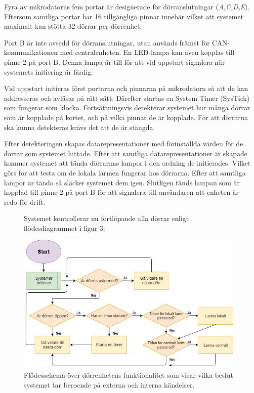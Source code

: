 \documentclass{article}
\begin{document}
Fyra av mikrodatorns fem portar är designerade för dörranslutningar (\textit{A,C,D,E}). \\ 
Eftersom samtliga portar har 16 tillgängliga pinnar innebär vilket att systemet maximalt kan stötta 32 dörrar per dörrenhet.

Port B är inte avsedd för dörranslutningar, utan används främst för CAN-\\kommunikationen 
med centralenheten. En LED-lampa kan även kopplas till \\ pinne 2 på port B. Denna lampa är till för att vid uppstart signalera när systemets initiering är färdig.

Vid uppstart initieras först portarna och pinnarna på mikrodatorn så att de kan addresseras 
och avläsas på rätt sätt. Därefter startas en System Timer (SysTick) som fungerar som klocka. 
Fortsättningsvis detekterar systemet hur många dörrar som är kopplade på kortet, och på vilka 
pinnar de är kopplade. För att dörrarna ska kunna detekteras krävs det att de är stängda.

Efter detekteringen skapas datarepresentationer med förinställda värden för de dörrar som systemet 
hittade. Efter att samtliga datarepresentationer är skapade kommer systemet att tända dörrarnas lampor 
i den ordning de initierades. Vilket görs för att testa om de lokala larmen fungerar hos dörrarna. Efter att samtliga lampor är tända så släcker systemet dem igen.
Slutligen tänds lampan som är kopplad till pinne 2 på port B för att signalera till användaren att enheten är redo för drift.
\newpage

\begin{figure}
\begin{flushleft}
Systemet kontrollerar nu fortlöpande alla dörrar enligt flödesdiagrammet i figur 3: \linebreak \newline
\end{flushleft} 
\centering
\includegraphics[scale=0.5]{figurer/Flow-Chart.png}
\caption{Flödesschema över dörrenhetens funktionalitet som visar vilka beslut systemet tar beroende på externa och interna händelser.}
\end{figure}
\end{document}
